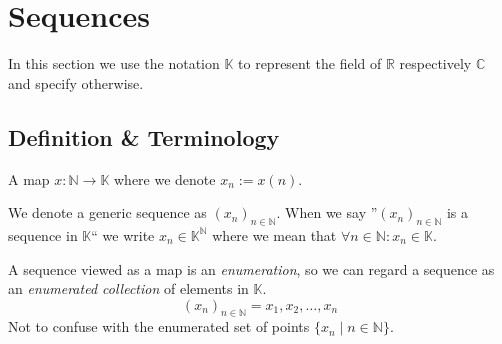 \section{Sequences}
In this section we use the notation \(\mathbb{K}\) to represent the field of \(\mathbb{R}\) respectively \(\mathbb{C}\) and specify otherwise.

\subsection{Definition \& Terminology}
\begin{definition}[Sequence]
   A map \(x: \mathbb{N} \to \mathbb{K}\) where we denote \(x_n := x(n)\).
\end{definition}
\begin{remark}[Notation]
   We denote a generic sequence as \((x_n)_{n \in \mathbb{N}}\).
   When we say ''\((x_n)_{n \in \mathbb{N}}\) is a sequence in \(\mathbb{K}\)`` we write \(x_n \in \mathbb{K}^\mathbb{N}\) where we mean that \(\forall n \in \mathbb{N}: x_n \in \mathbb{K}\).
\end{remark}
\begin{remark}[Intuition]
   A sequence viewed as a map is an \emph{enumeration}, so we can regard a sequence as an \emph{enumerated collection} of elements in \(\mathbb{K}\).
   \[(x_n)_{n \in \mathbb{N}} = x_1, x_2, \ldots, x_n\]
   Not to confuse with the enumerated set of points \(\{x_n \mid n \in \mathbb{N}\}\).
\end{remark}

